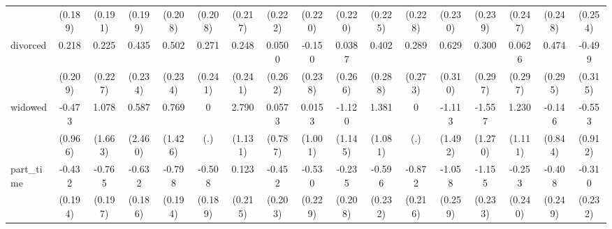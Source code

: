 {\begin{tabular}{l*{16}{c}}
                    &     (0.189)         &     (0.191)         &     (0.199)         &     (0.208)         &     (0.208)         &     (0.217)         &     (0.222)         &     (0.220)         &     (0.220)         &     (0.225)         &     (0.228)         &     (0.230)         &     (0.239)         &     (0.247)         &     (0.248)         &     (0.254)         \\
[1em]
divorced            &       0.218         &       0.225         &       0.435         &       0.502\sym{*}  &       0.271         &       0.248         &      0.0500         &      -0.150         &      0.0387         &       0.402         &       0.289         &       0.629\sym{*}  &       0.300         &      0.0626         &       0.474         &      -0.499         \\
                    &     (0.209)         &     (0.227)         &     (0.234)         &     (0.234)         &     (0.241)         &     (0.241)         &     (0.262)         &     (0.238)         &     (0.266)         &     (0.288)         &     (0.273)         &     (0.310)         &     (0.297)         &     (0.297)         &     (0.295)         &     (0.315)         \\
[1em]
widowed             &      -0.473         &       1.078         &       0.587         &       0.769         &           0         &       2.790\sym{*}  &      0.0573         &      0.0153         &      -1.120         &       1.381         &           0         &      -1.113         &      -1.557         &       1.230         &      -0.146         &      -0.553         \\
                    &     (0.966)         &     (1.663)         &     (2.460)         &     (1.426)         &         (.)         &     (1.131)         &     (0.787)         &     (1.001)         &     (1.145)         &     (1.081)         &         (.)         &     (1.492)         &     (1.270)         &     (1.111)         &     (0.844)         &     (0.912)         \\
[1em]
part\_time           &      -0.432\sym{*}  &      -0.765\sym{***}&      -0.632\sym{***}&      -0.798\sym{***}&      -0.508\sym{**} &       0.123         &      -0.452\sym{*}  &      -0.530\sym{*}  &      -0.235         &      -0.596\sym{*}  &      -0.872\sym{***}&      -1.058\sym{***}&      -1.155\sym{***}&      -0.253         &      -0.408         &      -0.310         \\
                    &     (0.194)         &     (0.197)         &     (0.186)         &     (0.194)         &     (0.189)         &     (0.215)         &     (0.203)         &     (0.229)         &     (0.208)         &     (0.232)         &     (0.216)         &     (0.259)         &     (0.233)         &     (0.240)         &     (0.249)         &     (0.232)         \\

\end{tabular}}
